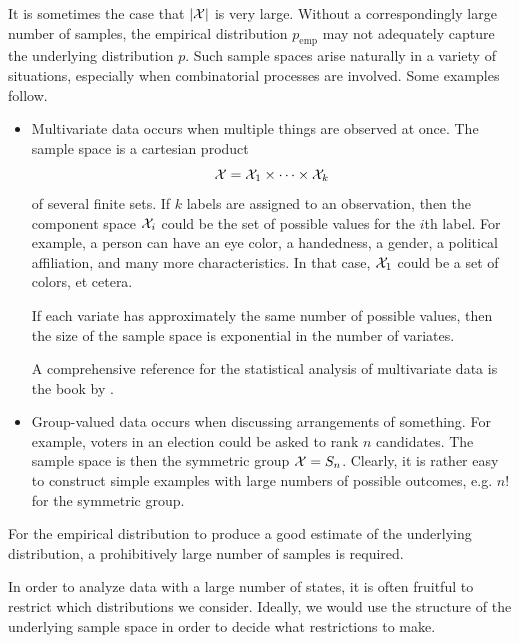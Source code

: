 \documentclass[cclicense]{hmcthesis}
\newcommand*{\emp}{\mathrm{emp}}
\numberwithin{equation}{chapter}
\numberwithin{ucounter}{chapter}
\begin{document}
    It is sometimes the case that $|\mathcal{X}|$ is very large.  Without a
    correspondingly large number of samples, the empirical distribution $p_\emp$
    may not adequately capture the underlying distribution $p$.  Such sample
    spaces arise naturally in a variety of situations, especially when
    combinatorial processes are involved.  Some examples follow.
    \begin{itemize}
    \item Multivariate data occurs when multiple things are observed at once.
    The sample space is a cartesian product
    \[
        \mathcal{X} = \mathcal{X}_1 \times \cdots \times \mathcal{X}_k
    \]
    of several finite sets.  If $k$ labels are assigned to an observation, then
    the component space $\mathcal{X}_i$ could be the set of possible values for the
    $i$th label.  For example, a person can have an eye color, a handedness, a
    gender, a political affiliation, and many more characteristics. In that
    case, $\mathcal{X}_1$ could be a set of colors, et cetera.
    
    If each variate has approximately the same number of possible values, then
    the size of the sample space is exponential in the number of variates.  

    A comprehensive reference for the statistical analysis of multivariate data
    is the book by \citet{DMA}.

    \item Group-valued data occurs when discussing arrangements of something.
    For example, voters in an election could be asked to rank $n$ candidates.
    The sample space is then the symmetric group $\mathcal{X} = S_n$.  Clearly, it is
    rather easy to construct simple examples with large numbers of possible
    outcomes, e.g.  $n!$ for the symmetric group.

    \end{itemize}
    For the empirical distribution to produce a good estimate of the underlying
    distribution, a prohibitively large number of samples is required.

    In order to analyze data with a large number of states, it is often fruitful
    to restrict which distributions we consider.  Ideally, we would use the
    structure of the underlying sample space in order to decide what
    restrictions to make.
\end{document}
